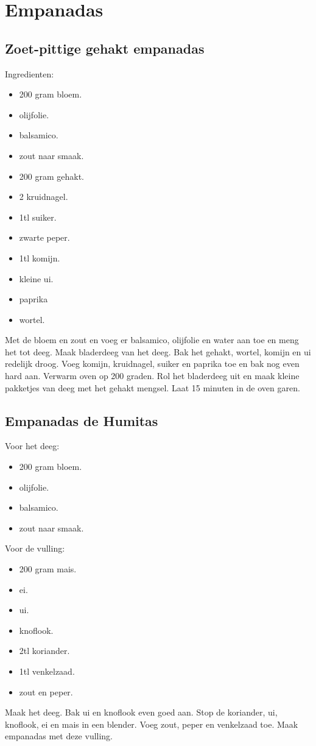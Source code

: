 \section{Empanadas}

\subsection{Zoet-pittige gehakt empanadas}

Ingredienten:
\begin{itemize}
\item 200 gram bloem.
\item olijfolie.
\item balsamico.
\item zout naar smaak.
\item 200 gram gehakt.
\item 2 kruidnagel.
\item 1tl suiker.
\item zwarte peper.
\item 1tl komijn.
\item kleine ui.
\item paprika
\item wortel.
\end{itemize}

Met de bloem en zout en voeg er balsamico, olijfolie en water aan toe en meng het tot deeg.
Maak bladerdeeg van het deeg.
Bak het gehakt, wortel, komijn en ui redelijk droog.
Voeg komijn, kruidnagel, suiker en paprika toe en bak nog even hard aan.
Verwarm oven op 200 graden.
Rol het bladerdeeg uit en maak kleine pakketjes van deeg met het gehakt mengsel.
Laat 15 minuten in de oven garen.

\subsection{Empanadas de Humitas}

Voor het deeg:
\begin{itemize}
\item 200 gram bloem.
\item olijfolie.
\item balsamico.
\item zout naar smaak.
\end{itemize}

Voor de vulling:
\begin{itemize}
\item 200 gram mais.
\item ei.
\item ui.
\item knoflook.
\item 2tl koriander.
\item 1tl venkelzaad.
\item zout en peper.
\end{itemize}

Maak het deeg.
Bak ui en knoflook even goed aan.
Stop de koriander, ui, knoflook, ei en mais in een blender.
Voeg zout, peper en venkelzaad toe.
Maak empanadas met deze vulling.
